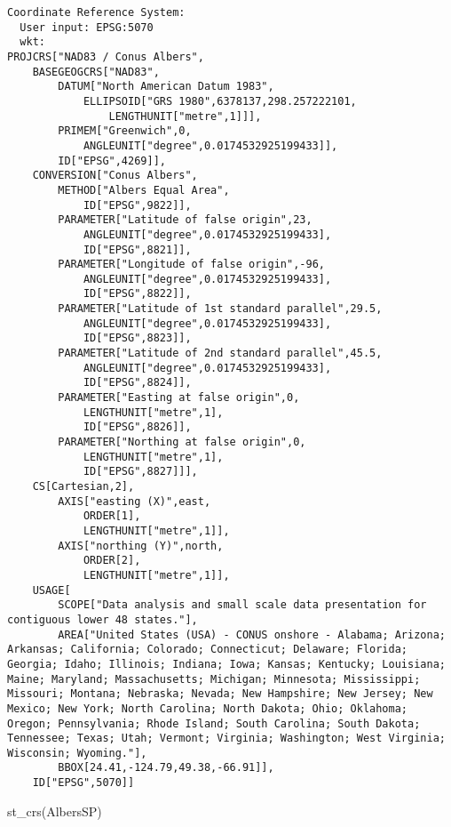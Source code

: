 \documentclass[
  letterpaper,
]{book}
\newenvironment{Shaded}{\begin{snugshade}}{\end{snugshade}}
\newcommand{\FunctionTok}[1]{\textcolor[rgb]{0.28,0.35,0.67}{#1}}
\newcommand{\NormalTok}[1]{\textcolor[rgb]{0.00,0.23,0.31}{#1}}
\begin{document}
\begin{verbatim}
Coordinate Reference System:
  User input: EPSG:5070 
  wkt:
PROJCRS["NAD83 / Conus Albers",
    BASEGEOGCRS["NAD83",
        DATUM["North American Datum 1983",
            ELLIPSOID["GRS 1980",6378137,298.257222101,
                LENGTHUNIT["metre",1]]],
        PRIMEM["Greenwich",0,
            ANGLEUNIT["degree",0.0174532925199433]],
        ID["EPSG",4269]],
    CONVERSION["Conus Albers",
        METHOD["Albers Equal Area",
            ID["EPSG",9822]],
        PARAMETER["Latitude of false origin",23,
            ANGLEUNIT["degree",0.0174532925199433],
            ID["EPSG",8821]],
        PARAMETER["Longitude of false origin",-96,
            ANGLEUNIT["degree",0.0174532925199433],
            ID["EPSG",8822]],
        PARAMETER["Latitude of 1st standard parallel",29.5,
            ANGLEUNIT["degree",0.0174532925199433],
            ID["EPSG",8823]],
        PARAMETER["Latitude of 2nd standard parallel",45.5,
            ANGLEUNIT["degree",0.0174532925199433],
            ID["EPSG",8824]],
        PARAMETER["Easting at false origin",0,
            LENGTHUNIT["metre",1],
            ID["EPSG",8826]],
        PARAMETER["Northing at false origin",0,
            LENGTHUNIT["metre",1],
            ID["EPSG",8827]]],
    CS[Cartesian,2],
        AXIS["easting (X)",east,
            ORDER[1],
            LENGTHUNIT["metre",1]],
        AXIS["northing (Y)",north,
            ORDER[2],
            LENGTHUNIT["metre",1]],
    USAGE[
        SCOPE["Data analysis and small scale data presentation for contiguous lower 48 states."],
        AREA["United States (USA) - CONUS onshore - Alabama; Arizona; Arkansas; California; Colorado; Connecticut; Delaware; Florida; Georgia; Idaho; Illinois; Indiana; Iowa; Kansas; Kentucky; Louisiana; Maine; Maryland; Massachusetts; Michigan; Minnesota; Mississippi; Missouri; Montana; Nebraska; Nevada; New Hampshire; New Jersey; New Mexico; New York; North Carolina; North Dakota; Ohio; Oklahoma; Oregon; Pennsylvania; Rhode Island; South Carolina; South Dakota; Tennessee; Texas; Utah; Vermont; Virginia; Washington; West Virginia; Wisconsin; Wyoming."],
        BBOX[24.41,-124.79,49.38,-66.91]],
    ID["EPSG",5070]]
\end{verbatim}

\begin{Shaded}
\begin{Highlighting}[]
\FunctionTok{st\_crs}\NormalTok{(AlbersSP)}
\end{Highlighting}
\end{Shaded}
\end{document}
